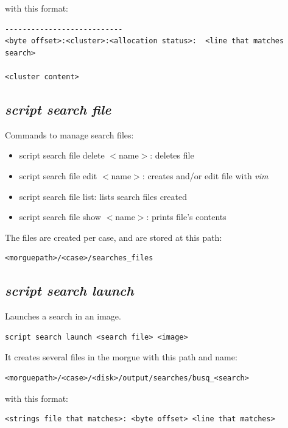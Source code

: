 \documentclass[a4paper,11pt,oneside]{report}
\begin{document}
with this format:

\begin{verbatim}
---------------------------
<byte offset>:<cluster>:<allocation status>:  <line that matches search>

<cluster content>
\end{verbatim}


\subsection{\emph{script search file}}

Commands to manage search files:

\begin{itemize}
\item	script search file delete $<$name$>$:  deletes file
\item	script search file edit $<$name$>$:  creates and/or edit file with \emph{vim}
\item	script search file list:  lists search files created
\item	script search file show $<$name$>$:  prints file's contents
\end{itemize}

The files are created per case, and are stored at this path:

\begin{verbatim}
<morguepath>/<case>/searches_files
\end{verbatim}


\subsection{\emph{script search launch}}

Launches a search in an image. 

\begin{verbatim}
script search launch <search file> <image>
\end{verbatim}

It creates several files in the morgue with this path and name:

\begin{verbatim}
<morguepath>/<case>/<disk>/output/searches/busq_<search>
\end{verbatim}

with this format:

\begin{verbatim}
<strings file that matches>: <byte offset> <line that matches>
\end{verbatim}
\end{document}
